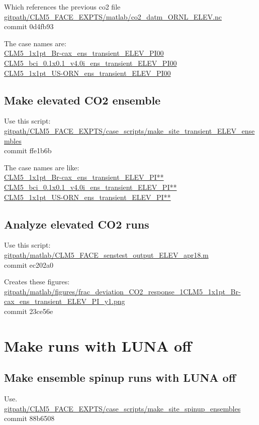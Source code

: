 \documentclass{article}
\begin{document}
Which references the previous co2 file\\
{\color{red}\small{\url{gitpath/CLM5_FACE_EXPTS/matlab/co2_datm_ORNL_ELEV.nc}}}\\
commit 0d4fb93

The case names are:\\
{\color{cyan}\small{\url{CLM5_1x1pt_Br-cax_ens_transient_ELEV_PI00}}}\\
{\color{cyan}\small{\url{CLM5_bci_0.1x0.1_v4.0i_ens_transient_ELEV_PI00}}}\\
{\color{cyan}\small{\url{CLM5_1x1pt_US-ORN_ens_transient_ELEV_PI00}}}

\subsection{Make elevated CO2 ensemble}
Use this script:\\
{\color{blue}\small{\url{gitpath/CLM5_FACE_EXPTS/case_scripts/make_site_transient_ELEV_ensembles}}}\\
commit ffe1b6b 

The case names are like:\\
{\color{cyan}\small{\url{CLM5_1x1pt_Br-cax_ens_transient_ELEV_PI**}}}\\
{\color{cyan}\small{\url{CLM5_bci_0.1x0.1_v4.0i_ens_transient_ELEV_PI**}}}\\
{\color{cyan}\small{\url{CLM5_1x1pt_US-ORN_ens_transient_ELEV_PI**}}} 

\subsection{Analyze elevated CO2 runs}
Use this script:\\
{\color{blue}\small{\url{gitpath/matlab/CLM5_FACE_senstest_output_ELEV_apr18.m}}}\\
commit ec202a0  

Creates these figures:
{\color{magenta}\small{\url{gitpath/matlab/figures/frac_deviation_CO2_response_1CLM5_1x1pt_Br-cax_ens_transient_ELEV_PI_y1.png}}}\\
commit 23ce56e

\section{Make runs with LUNA off}

\subsection{Make ensemble spinup runs with LUNA off}
Use.\\
{\color{blue}\small{\url{gitpath/CLM5_FACE_EXPTS/case_scripts/make_site_spinup_ensembles}} }\\
commit 88b6508    
\end{document}
